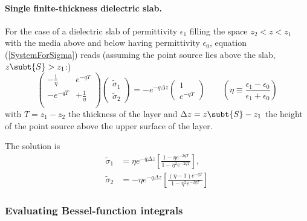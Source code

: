 \documentclass[letterpaper]{article}
\renewcommand{\wt}{\widetilde}
\begin{document}
\paragraph{Single finite-thickness dielectric slab.}
For the case of a dielectric slab of permittivity $\epsilon_1$
filling the space $z_2<z<z_1$ with the media above and below
having permittivity $\epsilon_0$, equation (\ref{SystemForSigma}) 
reads (assuming the point source lies above the slab, $z\subt{S}>z_1$:)
$$ \left(\begin{array}{cc}
   -\frac{1}{\eta} & e^{-qT} \\ 
   -e^{-qT} & +\frac{1}{\eta} \\
   \end{array}\right)
   \left(\begin{array}{c}\wt \sigma_1 \\ \wt \sigma_2\end{array}\right)
  =-e^{-q\Delta z}
   \left(\begin{array}{c}1 \\ e^{-qT} \end{array}\right)
  \qquad 
  \left(\eta\equiv\frac{\epsilon_1-\epsilon_0}{\epsilon_1+\epsilon_0}\right)
$$
with $T=z_1-z_2$ the thickness of the layer and $\Delta z=z\subt{S}-z_1$ the
height of the point source above the upper surface of the layer.

The solution is
\begin{align*}
 \wt\sigma_1 &= 
   \eta e^{-q \Delta z}\left[\frac{1-\eta e^{-2qT}}{1-\eta^2 e^{-2qT}}\right],
 \\
 \wt\sigma_2 &=
   -\eta e^{-q \Delta z}
    \left[\frac{ (\eta-1) e^{-qT}}{1-\eta^2 e^{-2qT}}\right]
\end{align*}

\subsubsection{Evaluating Bessel-function integrals}
\end{document}
